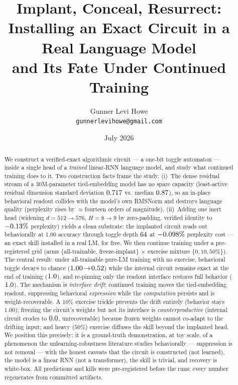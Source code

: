 \documentclass[10pt]{article}
\title{Implant, Conceal, Resurrect:\\ Installing an Exact Circuit in a Real Language Model\\
and Its Fate Under Continued Training}
\author{Gunner Levi Howe\\\texttt{gunnerlevihowe@gmail.com}}
\date{July 2026}
\begin{document}
\maketitle

\begin{abstract}
We construct a verified-exact algorithmic circuit --- a one-bit toggle automaton --- inside a single
head of a \emph{trained} linear-RNN language model, and study what continued training does to it.
Two construction facts frame the study. (i)~The dense residual stream of a $30$M-parameter
tied-embedding model has no spare capacity (least-active residual dimension standard deviation
$0.717$ vs.\ median $0.87$), so an in-place behavioral readout collides with the
model's own RMSNorm and destroys language quality (perplexity rises by $\approx$fourteen orders of
magnitude). (ii)~Adding one inert head (widening $d{=}512{\to}576$, $H{=}8{\to}9$ by zero-padding,
verified identity to $-0.13\%$ perplexity) yields a clean substrate: the implanted circuit
reads out behaviorally at $1.00$ accuracy through toggle depth $64$ at $-0.098\%$
perplexity cost --- an exact skill installed in a real LM, for free. We then continue training under a
pre-registered grid (arms $\{$all-trainable, freeze-implant$\}$ $\times$ exercise mixture
$\{0,10,50\%\}$). The central result: under all-trainable pure-LM training with no exercise,
behavioral toggle decays to chance ($1.00\!\to\!0.52$) while the internal circuit remains
exact at the end of training ($1.0$), and re-pinning only the readout interface restores
full behavior ($1.0$). The mechanism is \emph{interface drift}: continued training
moves the tied-embedding readout, suppressing behavioral \emph{expression} while the \emph{computation}
persists and is weight-recoverable. A $10\%$ exercise trickle prevents the drift entirely (behavior
stays $1.00$); freezing the circuit's weights but not its interface is \emph{counterproductive}
(internal circuit erodes to $0.0$, unrecoverable) because frozen weights cannot
co-adapt to the drifting input; and heavy ($50\%$) exercise diffuses the skill beyond the implanted
head. We position this precisely: it is a ground-truth demonstration, at toy scale, of a phenomenon
the unlearning-robustness literature studies behaviorally --- suppression is not removal --- with the
honest caveats that the circuit is constructed (not learned), the model is a linear RNN (not a
transformer), the skill is trivial, and recovery is white-box. All predictions and kills were
pre-registered before the runs; every number regenerates from committed artifacts.
\end{abstract}
\end{document}
